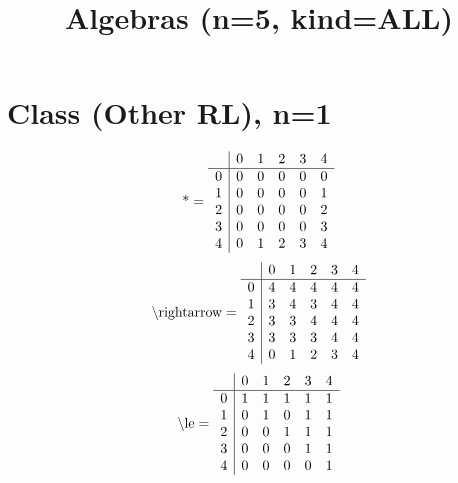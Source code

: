 \documentclass[11pt]{article}
\title{Algebras (n=5, kind=ALL)}
\date{}
\begin{document}
\maketitle
\tableofcontents
\section{Class (Other RL), n=1}
\[\text{*} = 
\begin{array}{r | r r r r r}
 & 0 & 1 & 2 & 3 & 4 \\ \hline
0 & 0 & 0 & 0 & 0 & 0 \\
1 & 0 & 0 & 0 & 0 & 1 \\
2 & 0 & 0 & 0 & 0 & 2 \\
3 & 0 & 0 & 0 & 0 & 3 \\
4 & 0 & 1 & 2 & 3 & 4 \\
\end{array}
\]
\[\text{\textbackslash rightarrow} = 
\begin{array}{r | r r r r r}
 & 0 & 1 & 2 & 3 & 4 \\ \hline
0 & 4 & 4 & 4 & 4 & 4 \\
1 & 3 & 4 & 3 & 4 & 4 \\
2 & 3 & 3 & 4 & 4 & 4 \\
3 & 3 & 3 & 3 & 4 & 4 \\
4 & 0 & 1 & 2 & 3 & 4 \\
\end{array}
\]
\[\text{\textbackslash le} = 
\begin{array}{r | r r r r r}
 & 0 & 1 & 2 & 3 & 4 \\ \hline
0 & 1 & 1 & 1 & 1 & 1 \\
1 & 0 & 1 & 0 & 1 & 1 \\
2 & 0 & 0 & 1 & 1 & 1 \\
3 & 0 & 0 & 0 & 1 & 1 \\
4 & 0 & 0 & 0 & 0 & 1 \\
\end{array}
\]
\end{document}
